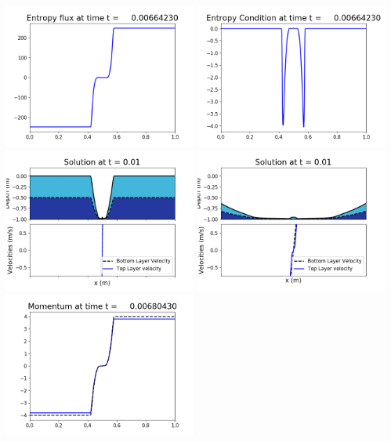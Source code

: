 \documentclass[11pt]{article}
\begin{document}
\includegraphics[width=0.475\textwidth]{frame0042fig1008.png}
\vskip 10pt 
\includegraphics[width=0.475\textwidth]{frame0042fig1009.png}
\vskip 10pt 
\includegraphics[width=0.475\textwidth]{frame0043fig1001.png}
\includegraphics[width=0.475\textwidth]{frame0043fig1002.png}
\vskip 10pt 
\includegraphics[width=0.475\textwidth]{frame0043fig1003.png}
\end{document}
